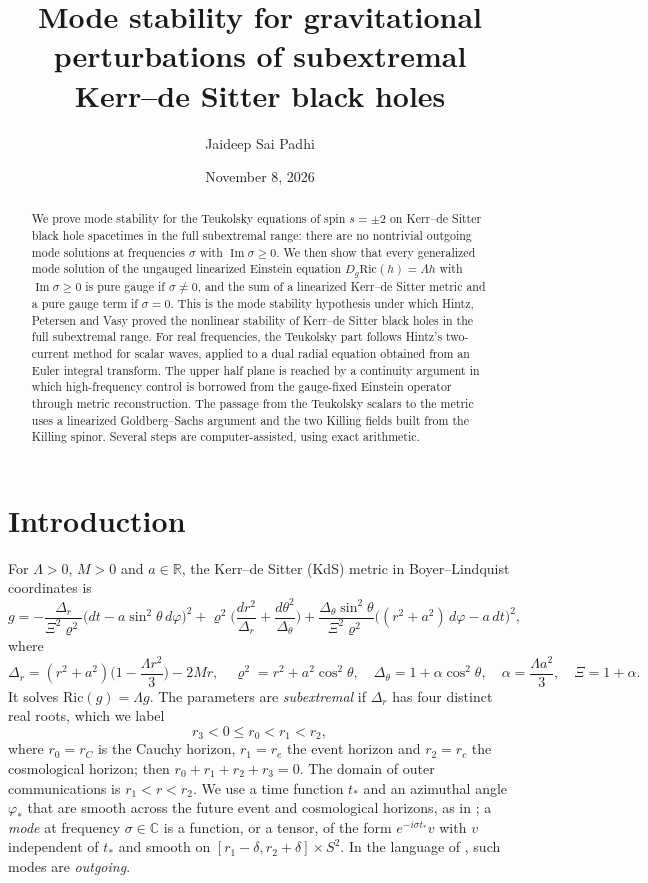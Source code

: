 \documentclass[11pt]{amsart}
\title[Gravitational mode stability of Kerr--de Sitter]{Mode stability for gravitational perturbations of subextremal Kerr--de Sitter black holes}
\author{Jaideep Sai Padhi}
\date{November 8, 2026}
\theoremstyle{definition}
\theoremstyle{remark}
\numberwithin{equation}{section}
\newcommand{\R}{\mathbb{R}}
\newcommand{\C}{\mathbb{C}}
\renewcommand{\Im}{\operatorname{Im}}
\begin{document}
\begin{abstract}
We prove mode stability for the Teukolsky equations of spin $s=\pm2$ on Kerr--de Sitter black hole spacetimes in the
full subextremal range: there are no nontrivial outgoing mode solutions at frequencies $\sigma$ with
$\Im\sigma\ge0$. We then show that every generalized mode solution of the ungauged linearized Einstein equation
$D_g\mathrm{Ric}(h)=\Lambda h$ with $\Im\sigma\ge0$ is pure gauge if $\sigma\ne0$, and the sum of a linearized
Kerr--de Sitter metric and a pure gauge term if $\sigma=0$. This is the mode stability hypothesis under which
Hintz, Petersen and Vasy proved the nonlinear stability of Kerr--de Sitter black holes in the full subextremal range.
For real frequencies, the Teukolsky part follows Hintz's two-current method for scalar waves, applied to a dual
radial equation obtained from an Euler integral transform. The upper half plane is reached by a continuity argument
in which high-frequency control is borrowed from the gauge-fixed Einstein operator through metric reconstruction.
The passage from the Teukolsky scalars to the metric uses a linearized Goldberg--Sachs argument and the two Killing
fields built from the Killing spinor. Several steps are computer-assisted, using exact arithmetic.
\end{abstract}

\maketitle
\tableofcontents

\section{Introduction}\label{sec:intro}

For $\Lambda>0$, $M>0$ and $a\in\R$, the Kerr--de Sitter (KdS) metric in Boyer--Lindquist coordinates is
\begin{equation}\label{eq:kds}
g=-\frac{\Delta_r}{\Xi^2\varrho^2}\big(dt-a\sin^2\theta\,d\varphi\big)^2+\varrho^2\Big(\frac{dr^2}{\Delta_r}+\frac{d\theta^2}{\Delta_\theta}\Big)
+\frac{\Delta_\theta\sin^2\theta}{\Xi^2\varrho^2}\big((r^2+a^2)\,d\varphi-a\,dt\big)^2,
\end{equation}
where
\[
\Delta_r=(r^2+a^2)\Big(1-\frac{\Lambda r^2}{3}\Big)-2Mr,\quad \varrho^2=r^2+a^2\cos^2\theta,\quad
\Delta_\theta=1+\alpha\cos^2\theta,\quad \alpha=\frac{\Lambda a^2}{3},\quad \Xi=1+\alpha.
\]
It solves $\mathrm{Ric}(g)=\Lambda g$. The parameters are \emph{subextremal} if $\Delta_r$ has four distinct real
roots, which we label
\[
r_3<0\le r_0<r_1<r_2,
\]
where $r_0=r_C$ is the Cauchy horizon, $r_1=r_e$ the event horizon and $r_2=r_c$ the cosmological horizon;
then $r_0+r_1+r_2+r_3=0$. The domain of outer communications is $r_1<r<r_2$. We use a time function $t_*$ and an
azimuthal angle $\varphi_*$ that are smooth across the future event and cosmological horizons, as in
\cite{HPV25,Hin26}; a \emph{mode} at frequency $\sigma\in\C$ is a function, or a tensor, of the form
$e^{-i\sigma t_*}v$ with $v$ independent of $t_*$ and smooth on $[r_1-\delta,r_2+\delta]\times S^2$. In the language of
\cite{Hin26}, such modes are \emph{outgoing}.
\end{document}
